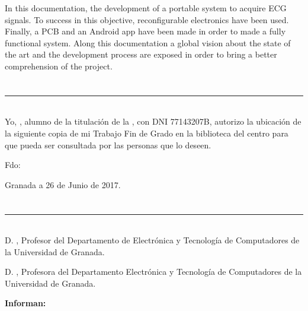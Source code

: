 In this documentation, the development of a portable system to acquire ECG signals. To success in this objective, reconfigurable electronics have been used. Finally, a PCB and an Android app have been made in order to made a fully functional system. Along this documentation a global vision about the state of the art and the development process are exposed in order to bring a better comprehension of the project.

\chapter*{}
\thispagestyle{empty}

\noindent\rule[-1ex]{\textwidth}{2pt}\\[4.5ex]

Yo, \textbf{\myName}, alumno de la titulación \myDegree de la \textbf{\myFaculty}, con DNI 77143207B, autorizo la ubicación de la siguiente copia de mi Trabajo Fin de Grado en la biblioteca del centro para que pueda ser consultada por las personas que lo deseen.

\vspace{6cm}

\noindent Fdo: \myName

\vspace{2cm}

\begin{flushright}
Granada a 26 de Junio de 2017.
\end{flushright}


\chapter*{}
\thispagestyle{empty}

\noindent\rule[-1ex]{\textwidth}{2pt}\\[4.5ex]

D. \textbf{\myProf}, Profesor del Departamento de Electrónica y Tecnología de Computadores de la Universidad de Granada.

\vspace{0.5cm}

D. \textbf{\myOtherProf}, Profesora del Departamento Electrónica y Tecnología de Computadores de la Universidad de Granada.


\vspace{0.5cm}

\textbf{Informan:}

\vspace{0.5cm}

